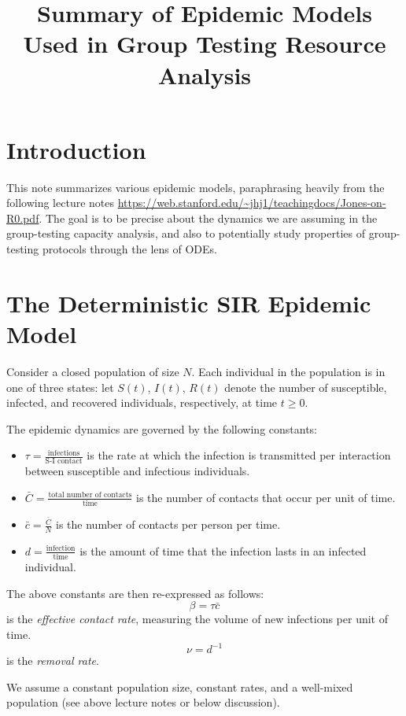 \documentclass[11pt]{article}
\title{Summary of Epidemic Models Used in Group Testing Resource Analysis}
\begin{document}
\maketitle
\section{Introduction}
This note summarizes various epidemic models, paraphrasing heavily from the following
lecture notes \url{https://web.stanford.edu/~jhj1/teachingdocs/Jones-on-R0.pdf}.
The goal is to be precise about the dynamics we are assuming in the group-testing
capacity analysis, and also to potentially study properties of group-testing protocols
through the lens of ODEs.

\section{The Deterministic SIR Epidemic Model}

Consider a closed population of size $N$.  Each individual in the population is
in one of three states: let $S(t)$, $I(t)$, $R(t)$ denote
the number of susceptible, infected, and recovered individuals, respectively, at time $t\geq 0$.

The epidemic dynamics are governed by the following constants:
\begin{itemize}
    \item $\tau=\frac{\mbox{infections}}{\mbox{S-I contact}}$ is the rate at which
        the infection is transmitted per interaction between susceptible and infectious individuals.
    \item $\bar{C} = \frac{\mbox{total number of contacts}}{\mbox{time}}$ is the number of contacts that occur per unit of time.
    \item $\bar{c}=\frac{\bar{C}}{N}$ is the number of contacts per person per time.
    \item $d=\frac{\mbox{infection}}{\mbox{time}}$ is the amount of time that the infection lasts in an infected individual.
\end{itemize}
The above constants are then re-expressed as follows:
$$
\beta = \tau\bar{c}
$$
is the \emph{effective contact rate}, measuring the volume of new infections per unit of time.
$$
\nu = d^{-1}
$$
is the \emph{removal rate}.

We assume a constant population size, constant rates, and a well-mixed population (see above lecture
notes or below discussion).
\end{document}
